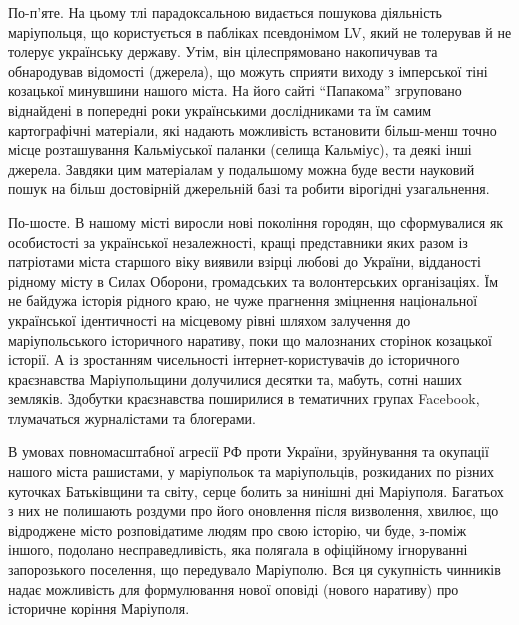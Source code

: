 
По-п'яте. На цьому тлі парадоксальною видається пошукова діяльність
маріупольця, що користується в пабліках псевдонімом LV, який не толерував й не
толерує українську державу. Утім, він цілеспрямовано накопичував та обнародував
відомості (джерела), що можуть сприяти виходу з імперської тіні козацької
минувшини нашого міста. На його сайті \enquote{Папакома} згруповано віднайдені в
попередні роки українськими дослідниками та їм самим картографічні матеріали,
які надають можливість встановити більш-менш точно місце розташування
Кальміуської паланки (селища Кальміус), та деякі інші джерела. Завдяки цим
матеріалам у подальшому можна буде вести науковий пошук на більш достовірній
джерельній базі та робити вірогідні узагальнення.

По-шосте. В нашому місті виросли нові покоління городян, що сформувалися як
особистості за української незалежності, кращі представники яких разом із
патріотами міста старшого віку виявили взірці любові до України, відданості
рідному місту в Силах Оборони, громадських та волонтерських організаціях. Їм не
байдужа історія рідного краю, не чуже прагнення зміцнення національної
української ідентичності на місцевому рівні шляхом залучення до маріупольського
історичного наративу, поки що малознаних сторінок козацької історії. А із
зростанням чисельності інтернет-користувачів до історичного краєзнавства
Маріупольщини долучилися десятки та, мабуть, сотні наших земляків. Здобутки
краєзнавства поширилися в тематичних групах Facebook, тлумачаться журналістами
та блогерами.


В умовах повномасштабної агресії РФ проти України,  зруйнування та окупації
нашого міста рашистами, у маріупольок та маріупольців, розкиданих по різних
куточках Батьківщини та світу, серце болить за нинішні дні Маріуполя. Багатьох
з них не полишають роздуми про його оновлення після визволення, хвилює, що
відроджене місто розповідатиме людям про свою історію, чи буде, з-поміж іншого,
подолано несправедливість, яка полягала в офіційному ігноруванні запорозького
поселення, що передувало Маріуполю. Вся ця сукупність чинників надає можливість
для формулювання нової оповіді (нового наративу) про історичне коріння
Маріуполя.


